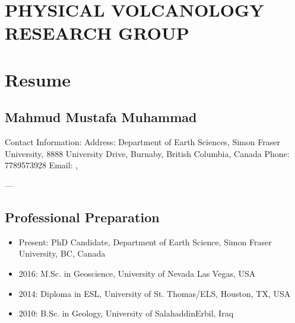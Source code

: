 \documentclass[letterpaper,10pt,english]{sphinxmanual}
\begin{document}
\sphinxstepscope


\section{PHYSICAL VOLCANOLOGY RESEARCH GROUP}
\label{\detokenize{aboutUS:physical-volcanology-research-group}}\label{\detokenize{aboutUS::doc}}

\begin{quote}


\end{quote}

\sphinxstepscope


\section{Resume}
\label{\detokenize{CV_Mahmud_2023:resume}}\label{\detokenize{CV_Mahmud_2023::doc}}

\subsection{Mahmud Mustafa Muhammad}
\label{\detokenize{CV_Mahmud_2023:mahmud-mustafa-muhammad}}
\sphinxAtStartPar
Contact Information:
\sphinxhyphen{} Address: Department of Earth Sciences, Simon Fraser University, 8888 University Drive, Burnaby, British Columbia, Canada
\sphinxhyphen{} Phone: 778\sphinxhyphen{}957\sphinxhyphen{}3928
\sphinxhyphen{} Email:  , 

\sphinxAtStartPar
—


\subsection{Professional Preparation}
\label{\detokenize{CV_Mahmud_2023:professional-preparation}}\begin{itemize}
\item {} 
\sphinxhyphen{}Present: PhD Candidate, Department of Earth Science, Simon Fraser University, BC, Canada

\item {} 
\sphinxhyphen{}2016: M.Sc. in Geoscience, University of Nevada Las Vegas, USA

\item {} 
\sphinxhyphen{}2014: Diploma in ESL, University of St. Thomas/ELS, Houston, TX, USA

\item {} 
\sphinxhyphen{}2010: B.Sc. in Geology, University of Salahaddin\sphinxhyphen{}Erbil, Iraq

\end{itemize}
\end{document}
